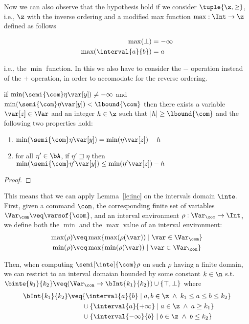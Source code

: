 Now we can also observe that the hypothesis hold if we consider
\(\tuple{\z,\geq}\), i.e., \(\z\) with the inverse ordering and a
modified max function \(\max : \Int \to \z\) defined as follows

\begin{align*}
  \max(\bot) & = -\infty \\
  \max(\interval{a}{b}) & = a \\
\end{align*}

i.e., the \(\min\) function. In this we also have to consider the
\(-\) operation instead of the \(+\) operation, in order to accomodate
for the reverse ordering.
 
\begin{corollary}\label{co:inc}
  if \(\min(\semi{\com}\eta\var[y]) \neq -\infty\) and
  \(\min(\semi{\com}\eta\var[y]) < \lbound{\com}\) then there exists a
  variable \(\var[z] \in\Var\) and an integer \(h\in\z\) such that
  \(|h| \geq \lbound{\com}\) and the following two properties hold:
  \begin{enumerate}[label=(\roman*)]
  \item \(\min(\semi{\com}\eta\var[y]) = \min(\eta\var[z]) - h\)
  \item for all \(\eta'\in \bA\), if \(\eta' \sqsupseteq \eta\) then
    \(\min(\semi{\com}\eta'\var[y]) \leq \min(\eta'\var[z]) - h\)
  \end{enumerate}
\end{corollary}

\begin{proof}
\end{proof}

This means that we can apply Lemma~\ref{le:inc} on the intervals
domain \(\inte\).  First, given a command \(\com\), the corresponding
finite set of variables \(\Var_{\com} \veq \varsof{\com}\), and an
interval environment \(\rho : \Var_{\com} \to \Int\), we define both
the \(\min\) and the \(\max\) value of an interval environment:
\begin{align*}
\max(\rho) & \veq \max \{ \max(\rho(\var)) \mid \var \in \Var_{\com}\} \\
\min(\rho) & \veq \max \{ \min(\rho(\var)) \mid \var \in \Var_{\com}\}
\end{align*}

% 
Then, when computing \(\semi[\inte]{\com} \rho\) on such \(\rho\)
having a finite domain, we can restrict to an interval domaian bounded
by some constant \(k\in\n\) s.t.
\(\binte{k_1}{k_2} \veq (\Var_{\com} \to \bInt{k_1}{k_2}) \cup \{\top, \bot\}\)
where
\begin{align*}
  \bInt{k_1}{k_2} & \veq \{ \interval{a}{b} \mid a, b \in \z \; \land \; k_1 \leq a \leq b \leq k_2\} \\
                  & \phantom{\veq} \cup \{\interval{a}{+\infty} \mid a \in \z \; \land \; a \geq k_1\} \\
                  & \phantom{\veq} \cup \{\interval{-\infty}{b} \mid b \in \z \; \land \; b \leq k_2\}
\end{align*}

